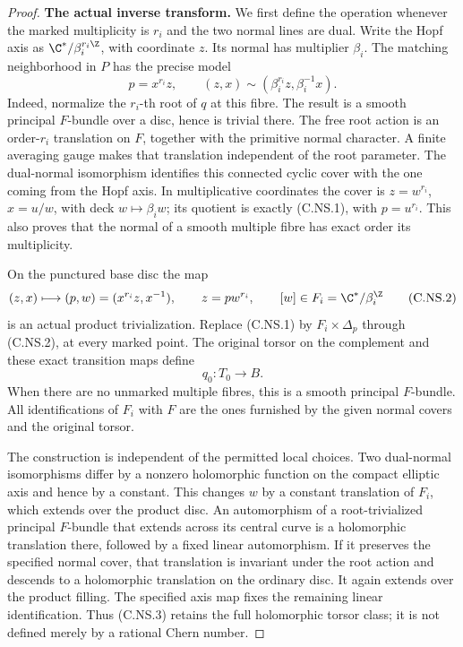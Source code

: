 \begin{proof}
\par\medskip\noindent\textbf{The actual inverse transform.}
We first define the operation whenever the marked
multiplicity is $r_i$ and the two normal lines are dual.
Write the Hopf axis as $\C^*/\beta_i^{r_i\Z}$, with
coordinate $z$. Its normal has multiplier $\beta_i$.
The matching neighborhood in $P$ has the precise model
\[
 p=x^{r_i}z,\qquad
 (z,x)\sim(\beta_i^{r_i}z,\beta_i^{-1}x).
                                                        \tag{C.NS.1}
\]
Indeed, normalize the $r_i$-th root of $q$ at this fibre.
The result is a smooth principal $F$-bundle over a disc,
hence is trivial there. The free root action is an
order-$r_i$ translation on $F$, together with the
primitive normal character. A finite averaging gauge
makes that translation independent of the root
parameter. The dual-normal isomorphism identifies this
connected cyclic cover with the one coming from the
Hopf axis. In multiplicative coordinates the cover is
$z=w^{r_i}$, $x=u/w$, with deck $w\mapsto\beta_i w$;
its quotient is exactly (C.NS.1), with $p=u^{r_i}$.
This also proves that the normal of a smooth
multiple fibre has exact order its multiplicity.

On the punctured base disc the map
\[
       (z,x)\longmapsto(p,w)=(x^{r_i}z,x^{-1}),
       \qquad z=pw^{r_i},
       \qquad [w]\in F_i=\C^*/\beta_i^{\Z}
                                                        \tag{C.NS.2}
\]
is an actual product trivialization. Replace (C.NS.1)
by $F_i\times\Delta_p$ through (C.NS.2), at every
marked point. The original torsor on the complement
and these exact transition maps define
\[
                             q_0:T_0\longrightarrow B.
                                                        \tag{C.NS.3}
\]
When there are no unmarked multiple fibres, this is a
smooth principal $F$-bundle. All identifications of
$F_i$ with $F$ are the ones furnished by the given
normal covers and the original torsor.

The construction is independent of the permitted local
choices. Two dual-normal isomorphisms differ by a
nonzero holomorphic function on the compact elliptic
axis and hence by a constant. This changes $w$ by a
constant translation of $F_i$, which extends over the
product disc. An automorphism of a root-trivialized
principal $F$-bundle that extends across its central
curve is a holomorphic translation there, followed by
a fixed linear automorphism. If it preserves the
specified normal cover, that translation is invariant
under the root action and descends to a holomorphic
translation on the ordinary disc. It again extends
over the product filling. The specified axis map
fixes the remaining linear identification. Thus
(C.NS.3) retains the full holomorphic torsor class;
it is not defined merely by a rational Chern number.


\end{proof}
